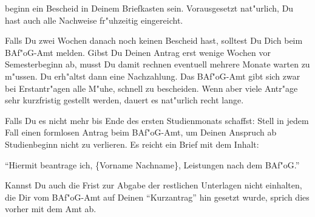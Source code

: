 \begin{artikel}{}
\vspace{-20pt}
beginn ein Bescheid in Deinem Briefkasten sein. Vorausgesetzt nat"urlich, Du hast auch alle Nachweise fr"uhzeitig eingereicht.

Falls Du zwei Wochen danach noch keinen Bescheid hast, solltest Du Dich beim BAf"oG-Amt melden. Gibst Du Deinen Antrag erst wenige Wochen vor Semesterbeginn ab, musst Du damit rechnen eventuell mehrere Monate warten zu m"ussen. Du erh"altst dann eine Nachzahlung. Das BAf"oG-Amt gibt sich zwar bei Erstantr"agen alle M"uhe, schnell zu bescheiden. Wenn aber viele Antr"age sehr kurzfristig gestellt werden, dauert es nat"urlich recht lange.

Falls Du es nicht mehr bis Ende des ersten Studienmonats schaffst: Stell in jedem Fall einen formlosen Antrag beim BAf"oG-Amt, um Deinen Anspruch ab Studienbeginn nicht zu verlieren. Es reicht ein Brief mit dem Inhalt:

"`Hiermit beantrage ich, \{Vorname Nachname\}, Leistungen nach dem BAf"oG."'

Kannst Du auch die Frist zur Abgabe der restlichen Unterlagen nicht einhalten, die Dir vom BAf"oG-Amt auf Deinen "`Kurzantrag"' hin gesetzt wurde, sprich dies vorher mit dem Amt ab.
\end{artikel}
